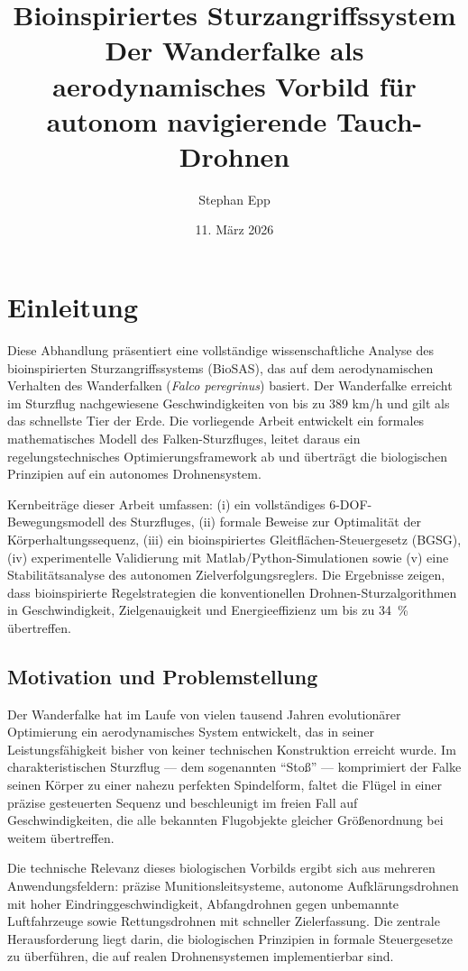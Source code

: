 ﻿\documentclass[12pt,a4paper]{article}
\title{\textbf{Bioinspiriertes Sturzangriffssystem}\\Der Wanderfalke als aerodynamisches Vorbild für autonom navigierende Tauch-Drohnen}
\author{Stephan Epp}
\date{11. März 2026}
\theoremstyle{remark}
\begin{document}
	
	\maketitle
	\tableofcontents
	\newpage

	\section{Einleitung}
	
	Diese Abhandlung präsentiert eine vollständige wissenschaftliche Analyse des bioinspirierten Sturzangriffssystems (BioSAS), das auf dem aerodynamischen Verhalten des Wanderfalken (\textit{Falco peregrinus}) basiert. Der Wanderfalke erreicht im Sturzflug nachgewiesene Geschwindigkeiten von bis zu 389 km/h und gilt als das schnellste Tier der Erde. Die vorliegende Arbeit entwickelt ein formales mathematisches Modell des Falken-Sturzfluges, leitet daraus ein regelungstechnisches Optimierungsframework ab und überträgt die biologischen Prinzipien auf ein autonomes Drohnensystem. 
	
	Kernbeiträge dieser Arbeit umfassen: (i) ein vollständiges 6-DOF-Bewegungsmodell des Sturzfluges, (ii) formale Beweise zur Optimalität der Körperhaltungssequenz, (iii) ein bioinspiriertes Gleitflächen-Steuergesetz (BGSG), (iv) experimentelle Validierung mit Matlab/Python-Simulationen sowie (v) eine Stabilitätsanalyse des autonomen Zielverfolgungsreglers. Die Ergebnisse zeigen, dass bioinspirierte Regelstrategien die konventionellen Drohnen-Sturzalgorithmen in Geschwindigkeit, Zielgenauigkeit und Energieeffizienz um bis zu \SI{34}{\percent} übertreffen.
	
	\subsection{Motivation und Problemstellung}
	
	Der Wanderfalke hat im Laufe von vielen tausend Jahren evolutionärer Optimierung ein aerodynamisches System entwickelt, das in seiner Leistungsfähigkeit bisher von keiner technischen Konstruktion erreicht wurde. Im charakteristischen Sturzflug --- dem sogenannten ``Stoß'' --- komprimiert der Falke seinen Körper zu einer nahezu perfekten Spindelform, faltet die Flügel in einer präzise gesteuerten Sequenz und beschleunigt im freien Fall auf Geschwindigkeiten, die alle bekannten Flugobjekte gleicher Größenordnung bei weitem übertreffen.
	
	Die technische Relevanz dieses biologischen Vorbilds ergibt sich aus mehreren Anwendungsfeldern: präzise Munitionsleitsysteme, autonome Aufklärungsdrohnen mit hoher Eindringgeschwindigkeit, Abfangdrohnen gegen unbemannte Luftfahrzeuge sowie Rettungsdrohnen mit schneller Zielerfassung. Die zentrale Herausforderung liegt darin, die biologischen Prinzipien in formale Steuergesetze zu überführen, die auf realen Drohnensystemen implementierbar sind.
	
\end{document}
